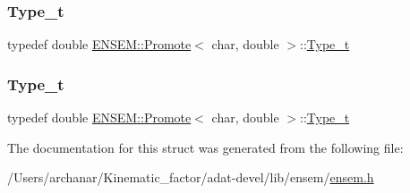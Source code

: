 \mbox{\label{structENSEM_1_1Promote_3_01char_00_01double_01_4_a2d74824409365a6005f55424a8314837}} 
\subsubsection{\texorpdfstring{Type\_t}{Type\_t}\hspace{0.1cm}{\footnotesize\ttfamily [2/3]}}
{\footnotesize\ttfamily typedef double \mbox{\hyperlink{structENSEM_1_1Promote}{E\+N\+S\+E\+M\+::\+Promote}}$<$ char, double $>$\+::\mbox{\hyperlink{structENSEM_1_1Promote_3_01char_00_01double_01_4_a2d74824409365a6005f55424a8314837}{Type\+\_\+t}}}

\mbox{\label{structENSEM_1_1Promote_3_01char_00_01double_01_4_a2d74824409365a6005f55424a8314837}} 
\subsubsection{\texorpdfstring{Type\_t}{Type\_t}\hspace{0.1cm}{\footnotesize\ttfamily [3/3]}}
{\footnotesize\ttfamily typedef double \mbox{\hyperlink{structENSEM_1_1Promote}{E\+N\+S\+E\+M\+::\+Promote}}$<$ char, double $>$\+::\mbox{\hyperlink{structENSEM_1_1Promote_3_01char_00_01double_01_4_a2d74824409365a6005f55424a8314837}{Type\+\_\+t}}}



The documentation for this struct was generated from the following file\+:\begin{DoxyCompactItemize}
\item 
/\+Users/archanar/\+Kinematic\+\_\+factor/adat-\/devel/lib/ensem/\mbox{\hyperlink{adat-devel_2lib_2ensem_2ensem_8h}{ensem.\+h}}\end{DoxyCompactItemize}
